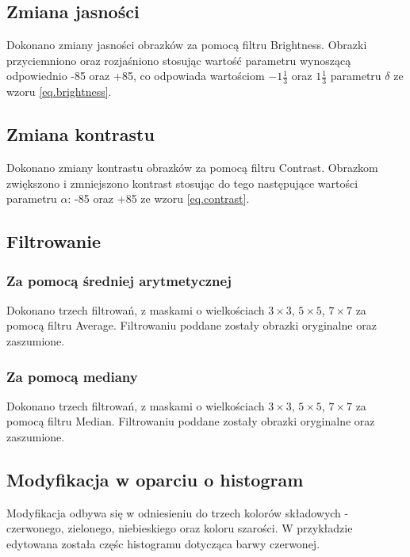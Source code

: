 \documentclass{classrep}
\begin{document}
\subsection{Zmiana jasności}
\label{sec.tests.brightness}
Dokonano zmiany jasności obrazków za pomocą filtru Brightness. Obrazki przyciemniono oraz rozjaśniono stosując wartość parametru wynoszącą odpowiednio -85 oraz +85, co odpowiada wartościom $-1\frac{1}{3}$ oraz $1\frac{1}{3}$ parametru $\delta$ ze wzoru \ref{eq.brightness}.

\subsection{Zmiana kontrastu}
\label{sec.tests.contrast}
Dokonano zmiany kontrastu obrazków za pomocą filtru Contrast. Obrazkom zwiększono i zmniejszono kontrast stosując do tego następujące wartości parametru $\alpha$: -85 oraz +85 ze wzoru \ref{eq.contrast}.

\subsection{Filtrowanie}
\label{sec.tests.filtering}
\subsubsection{Za pomocą średniej arytmetycznej}
\label{sec.tests.filtering.average}
Dokonano trzech filtrowań, z maskami o wielkościach $3 \times 3$, $5 \times 5$, $7 \times 7$ za pomocą filtru Average. Filtrowaniu poddane zostały obrazki oryginalne oraz zaszumione.

\subsubsection{Za pomocą mediany}
\label{sec.tests.filtering.median}
Dokonano trzech filtrowań, z maskami o wielkościach $3 \times 3$, $5 \times 5$, $7 \times 7$ za pomocą filtru Median. Filtrowaniu poddane zostały obrazki oryginalne oraz zaszumione.

\subsection{Modyfikacja w oparciu o histogram}
\label{sec.tests.histogram}
Modyfikacja odbywa się w odniesieniu do trzech kolorów składowych - czerwonego, zielonego, niebieskiego oraz koloru szarości. W przykładzie edytowana została częśc histogramu dotycząca barwy czerwonej.
\end{document}
